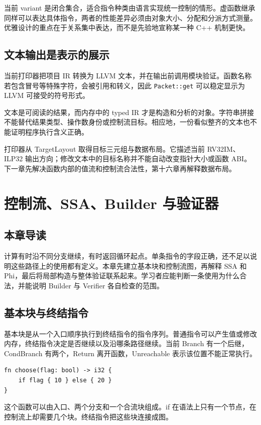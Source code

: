 当前 variant 是闭合集合，适合指令种类由语言实现统一控制的情形。虚函数继承同样可以表达具体指令，两者的性能差异必须由对象大小、分配和分派方式测量。优雅设计的重点在于关系集中表达，而不是先验地宣称某一种 C++ 机制更快。

\section{文本输出是表示的展示}
当前打印器把项目 IR 转换为 LLVM 文本，并在输出前调用模块验证。函数名称若包含冒号等特殊字符，会被引用和转义，因此 \texttt{Packet::get} 可以稳定显示为 LLVM 可接受的符号形式。

文本是可阅读的结果，而内存中的 typed IR 才是构造和分析的对象。字符串拼接不能替代结果类型、操作数身份或控制流目标。相应地，一份看似整齐的文本也不能证明程序执行含义正确。

打印器从 TargetLayout 取得目标三元组与数据布局。它描述当前 RV32IM、ILP32 输出方向；修改文本中的目标名称并不能自动改变指针大小或函数 ABI。下一章先解决函数内部的值流和控制流合法性，第十六章再解释数据布局。

\chapter{控制流、SSA、Builder 与验证器}
\label{chap:cfg-ssa}
\section*{本章导读}
计算有时沿不同分支继续，有时返回循环起点。单条指令的字段正确，还不足以说明这些路径上的使用都有定义。本章先建立基本块和控制流图，再解释 SSA 和 Phi，最后将局部构造与整体验证联系起来。学习者应能判断一条使用为什么合法，并能说明 Builder 与 Verifier 各自检查的范围。

\section{基本块与终结指令}
基本块是从一个入口顺序执行到终结指令的指令序列。普通指令可以产生值或修改内存，终结指令决定是否继续以及沿哪条路径继续。当前 Branch 有一个后继，CondBranch 有两个，Return 离开函数，Unreachable 表示该位置不能正常执行。
\begin{lstlisting}[language=Rustless,caption={产生结果的条件表达式}]
fn choose(flag: bool) -> i32 {
    if flag { 10 } else { 20 }
}
\end{lstlisting}
这个函数可以由入口、两个分支和一个合流块组成。if 在语法上只有一个节点，在控制流上却需要几个块。终结指令把这些块连接成图。


